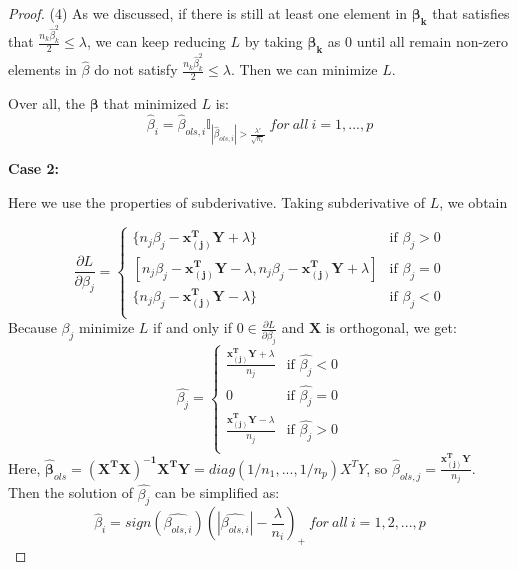 \documentclass{article}
\newtheorem{proof}{Proof}
\begin{document}
\begin{appendices}
\begin{proof}
	(4) As we discussed, if there is still at least one element in $\bm{\beta_k}$ that satisfies that $\frac{n_k\hat{\beta}_k^2}{2}\leq\lambda$, we can keep reducing $L$ by taking $\bm{\beta_k}$ as 0 until all remain non-zero elements in $\hat{\beta}$ do not satisfy $\frac{n_k\hat{\beta}_k^2}{2}\leq\lambda$. Then we can minimize $L$.\par 
	Over all, the $\bm{\beta}$ that minimized $L$ is:
	\begin{equation*}
			\hat{\beta}_i = \hat{\beta}_{ols,i}\mathbb{I}_{|\hat{\beta}_{ols,i}|>\frac{\lambda'}{\sqrt{n_i}}}\ for\ all\ i=1,...,p
	\end{equation*}
	
\textbf{Case 2:}\par
Here we use the properties of subderivative. Taking subderivative of $L$, we obtain
	
\begin{equation*}
\frac{\partial L}{\partial \beta_j} = 
\begin{cases}
\{n_j\beta_j-\mathbf{x_{(j)}^TY}+\lambda\} &\mbox{if $\beta_j>0$}\\
 [n_j\beta_j-\mathbf{x_{(j)}^TY}-\lambda, n_j\beta_j-\mathbf{x_{(j)}^TY}+\lambda]&\mbox{if $\beta_j=0$}\\
\{n_j\beta_j-\mathbf{x_{(j)}^TY}-\lambda\} &\mbox{if $\beta_j<0$}\\
\end{cases}
\end{equation*}
Because $\beta_j$ minimize $L$ if and only if $0 \in \frac{\partial L}{\partial \beta_j}$ and  $\mathbf{X}$ is orthogonal, we get:
\begin{equation*}
\hat{\beta_j} = 
\begin{cases}
\frac{\mathbf{x_{(j)}^TY}+\lambda}{n_j}&\mbox{if $\hat{\beta_j}<0$}\\
0 &\mbox{if $\hat{\beta_j}=0$}\\
\frac{\mathbf{x_{(j)}^TY}-\lambda}{n_j}&\mbox{if $\hat{\beta_j}>0$}\\
\end{cases}
\end{equation*}
Here, $\bm{\hat{\beta}}_{ols} = \mathbf{(X^TX)^{-1}X^TY} = diag(1/n_1, ..., 1/n_p)X^TY$, so $\hat{\beta}_{ols,j}=\frac{\mathbf{x_{(j)}^TY}}{n_j}$. Then the solution of $\hat{\beta_j}$ can be simplified as:
\begin{equation*}
	\hat{\beta}_i = sign(\hat{\beta_{ols,i}})(|\hat{\beta_{ols,i}}|-\frac{\lambda}{n_i})_+\ for\ all\ i=1,2,...,p
\end{equation*}
\end{proof}

\end{appendices}
\end{document}
